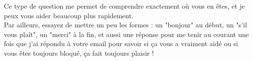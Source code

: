 \documentclass[answers]{exam}
\begin{document}
\vspace{1em}

Ce type de question me permet de comprendre exactement où vous en êtes, et je peux vous aider beaucoup plus rapidement. \\

Par ailleurs, essayez de mettre un peu les formes : un "bonjour" au début, un "s'il vous plaît", un "merci" à la fin, et aussi une réponse pour me tenir
au courant une fois que j'ai répondu à votre email pour savoir si ça vous a vraiment aidé ou si vous êtes toujours bloqué, ça fait toujours plaisir !
\end{document}
